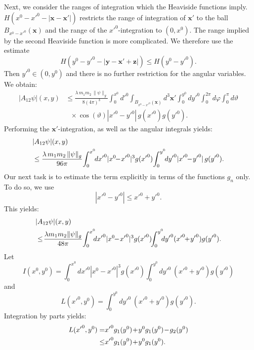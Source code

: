 \documentclass[b5paper,draft,openbib,12pt]{memoir}
\newcommand{\vx}{\mathbf{x}}
\newcommand{\vy}{\mathbf{y}}
\newcommand{\vz}{\mathbf{z}}
\begin{document}
Next, we consider the ranges of integration which the Heaviside 
functions imply. $H(x^0-{x'}^0-|\vx-\vx'|)$ restricts the range 
of integration of $\vx'$ to the ball $B_{x^0-{x'}^0}(\vx)$ and the 
range of the ${x'}^0$-integration to $(0,x^0)$. The range implied 
by the second Heaviside function is more complicated. We therefore 
use the estimate
\begin{equation}
	H(y^0-{y'}^0-|\vy-\vx'+\vz|) \leq H(y^0-{y'}^0).
\end{equation}
Then ${y'}^0 \in (0,y^0)$ and there is no further restriction for 
the angular variables. We obtain:
\begin{align}
|A_{12} \psi|(x,y) &\leq \frac{\lambda \, m_1 m_2 \, \| \psi \|_g}{8(4\pi)^3}  \int_0^{x^0} d{'}^0 \int_{B_{x^0-{x'}^0}(\vx)} \!\!\!\!\!\!\!\!\!\! d^3 \vx' \int_0^{y^0} d{y'}^0 \int_0^{2\pi} d\varphi \int_{0}^{\pi} d \vartheta \nonumber\\
&~~~\times \cos(\vartheta) |{x'}^0-{y'}^0| \, g({x'}^0)g({y'}^0).
\end{align}
Performing the $\vx'$-integration, as well as the angular integrals 
yields:
\begin{align}
  &|A_{12} \psi|(x,y) \notag\\
  &\leq \frac{\lambda \, m_1 m_2 \, \| \psi \|_g}{96\pi}\!  \int_0^{x^0}\!\! d{x'}^0 |x^0\!\!-\!{x'}^0|^3 g({x'}^0)\! \int_0^{y^0}\!\! d{y'}^0 |{x'}^0\!\!-\!{y'}^0| \, g({y'}^0).
\end{align}
Our next task is to estimate the term explicitly in terms of the 
functions $g_n$ only. To do so, we use
\begin{equation}
	|{x'}^0-{y'}^0| \leq {x'}^0 + {y'}^0.
\end{equation}
This yields:
\begin{align}
  &|A_{12} \psi|(x,y) \notag\\
  &\leq \!\frac{\lambda  m_1 m_2  \| \psi \|_g}{48\pi}\!  \int_0^{x^0} \!\!\!d{x'}^0 |x^0\!\!-\!{x'}^0|^3 g({x'}^0) \!\!\int_0^{y^0} \!\!\!d{y'}^0 ({x'}^0 \!\!+\! {y'}^0) g({y'}^0).
\label{eq:a12estimatecalc}
\end{align}
Let
\begin{equation}
	I(x^0,y^0) = \int_0^{x^0} d{x'}^0 |x^0-{x'}^0|^3 g({x'}^0) \int_0^{y^0} d{y'}^0~ ({x'}^0 + {y'}^0) g({y'}^0)
\end{equation}
and
\begin{equation}
	L({x'}^0,y^0) = \int_0^{y^0} d{y'}^0~ ({x'}^0 + {y'}^0) g({y'}^0).
\end{equation}
Integration by parts yields:
\begin{align}
  L({x'}^0,y^0) =& {x'}^0 g_1(y^0) \!+\! y^0 g_1(y^0) \!-\! g_2(y^0) \notag\\
  \leq& {x'}^0 g_1(y^0) \!+\! y^0 g_1(y^0).
\end{align}
\end{document}
